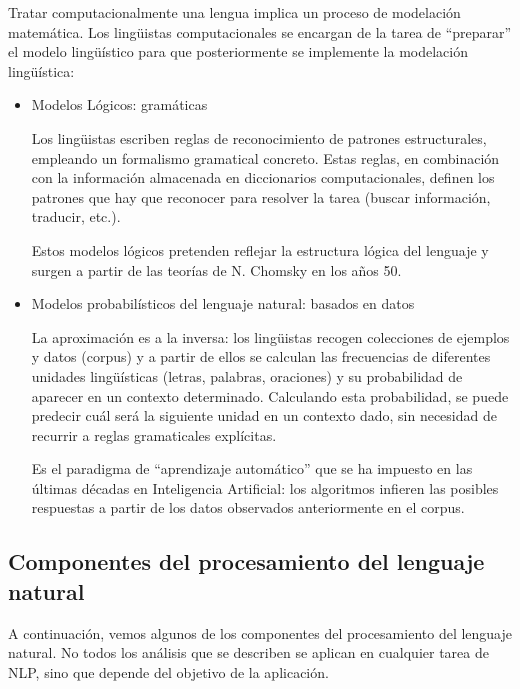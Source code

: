 \documentclass[runningheads]{llncs}
\begin{document}
Tratar computacionalmente una lengua implica un proceso de modelación matemática. Los lingüistas computacionales se encargan de la tarea de “preparar” el modelo lingüístico para que posteriormente se implemente la modelación lingüística:
\begin{itemize}


\item{Modelos Lógicos: gramáticas

Los lingüistas escriben reglas de reconocimiento de patrones estructurales, empleando un formalismo gramatical concreto. Estas reglas, en combinación con la información almacenada en diccionarios computacionales, definen los patrones que hay que reconocer para resolver la tarea (buscar información, traducir, etc.).

Estos modelos lógicos pretenden reflejar la estructura lógica del lenguaje y surgen a partir de las teorías de N. Chomsky en los años 50.} 


\item{Modelos probabilísticos del lenguaje natural: basados en datos

La aproximación es a la inversa: los lingüistas recogen colecciones de ejemplos y datos (corpus) y a partir de ellos se calculan las frecuencias de diferentes unidades lingüísticas (letras, palabras, oraciones) y su probabilidad de aparecer en un contexto determinado. Calculando esta probabilidad, se puede predecir cuál será la siguiente unidad en un contexto dado, sin necesidad de recurrir a reglas gramaticales explícitas.

Es el paradigma de “aprendizaje automático” que se ha impuesto en las últimas décadas en Inteligencia Artificial: los algoritmos infieren las posibles respuestas a partir de los datos observados anteriormente en el corpus.}
\end{itemize}

\subsection{Componentes del procesamiento del lenguaje natural}

A continuación, vemos algunos de los componentes del procesamiento del lenguaje natural. No todos los análisis que se describen se aplican en cualquier tarea de NLP, sino que depende del objetivo de la aplicación.
\end{document}
